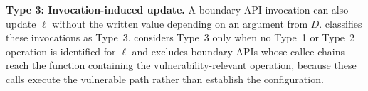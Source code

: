 \vspace{3px}
\noindent\textbf{Type 3: Invocation-induced update.}
A boundary API invocation can also update $\ell$ without the written value depending on an argument from $D$. \sys classifies these invocations as Type~3. \sys considers Type~3 only when no Type~1 or Type~2 operation is identified for $\ell$ and excludes boundary APIs whose callee chains reach the function containing the vulnerability-relevant operation, because these calls execute the vulnerable path rather than establish the configuration.









